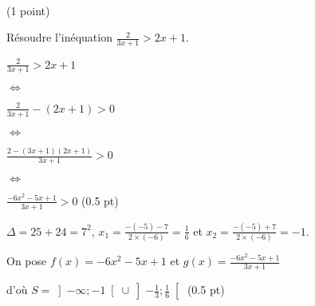 \documentclass[a4paper,11pt]{article}
\theoremstyle{break}
\begin{document}
     ~
  \vspace{0.5cm}
  
  \begin{exo}(1 point)
   
  
  Résoudre l'inéquation $\frac{2}{3x+1} > 2x+1$.
  
\begin{correction}

 $\frac{2}{3x+1} > 2x+1$
 
 $\Leftrightarrow$
 
 $\frac{2}{3x+1} - (2x+1) >0$
 
 $\Leftrightarrow$
 
 $\frac{2-(3x+1)(2x+1)}{3x+1}>0$
 
 $\Leftrightarrow$
 
 $\frac{-6x^2-5x+1}{3x+1}>0$ (0.5 pt)
 
 $\Delta=25+24=7^2$, $x_1=\frac{-(-5)-7}{2\times (-6)}=\frac{1}{6}$ et $x_2=\frac{-(-5)+7}{2\times (-6)}=-1$. 
 
 On pose $f(x)=-6x^2-5x+1$ et $g(x)=\frac{-6x^2-5x+1}{3x+1}$
 
 
 d'o\`u $S=\left ]-\infty;-1\right [ \cup \left ]-\frac{1}{3};\frac{1}{6} \right [$ (0.5 pt)
\end{correction}
\end{exo}
    
\end{document}
